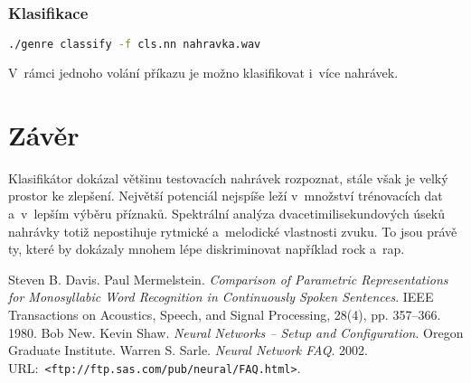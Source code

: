 \documentclass[10pt,a4paper,twocolumn]{article}
\begin{document}
\subsubsection{Klasifikace}

\begin{lstlisting}[language=sh]
./genre classify -f cls.nn nahravka.wav
\end{lstlisting}

V~rámci jednoho volání příkazu je možno klasifikovat i~více nahrávek.

\section{Závěr}

Klasifikátor dokázal většinu testovacích nahrávek rozpoznat,
stále však je velký prostor ke zlepšení.
Největší potenciál nejspíše leží v~množství trénovacích dat
a~v~lepším výběru příznaků. Spektrální analýza dvacetimilisekundových
úseků nahrávky totiž nepostihuje rytmické a~melodické vlastnosti zvuku.
To jsou právě ty, které by dokázaly mnohem lépe diskriminovat
například rock a~rap.

\vfill
\begin{thebibliography}{9}
   Steven B. Davis. Paul Mermelstein.
                 \emph{Comparison of Parametric Representations for Monosyllabic Word Recognition in Continuously Spoken Sentences}.
                 IEEE Transactions on Acoustics, Speech, and Signal Processing, 28(4), pp. 357–366. 1980.
   Bob New. Kevin Shaw. \emph{Neural Networks -- Setup and Configuration}. Oregon Graduate Institute.
   Warren S. Sarle. \emph{Neural Network FAQ}. 2002. URL:~\verb|<ftp://ftp.sas.com/pub/neural/FAQ.html>|.
\end{thebibliography}

\newpage
\appendix
\end{document}

